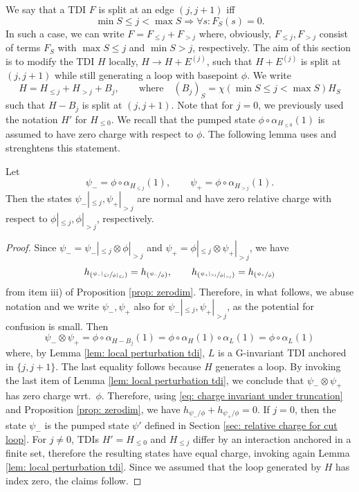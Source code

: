 We say that a TDI $F$ is split at an edge $(j,j+1)$ iff\
$$
\min S \leq j <\max S  \Rightarrow \forall s: F_S(s)=0.
$$
In such a case, we can write $F=F_{\leq j}+F_{>j}$ where, obviously, $F_{\leq j}, F_{>j}$ consist of terms $F_S$ with $\max S\leq j$ and $\min S>j$, respectively. The aim of this section is to modify the TDI $H$ locally, $H \to H+E^{(j)}$, such that $H+E^{(j)}$ is split at $(j,j+1)$  while still generating a loop with basepoint $\phi$.
We write 
$$
H=H_{\leq j}+H_{>j} + B_j,\qquad \text{where}\quad (B_j)_S= \chi( \min S \leq j <\max S)  H_S
$$ 
such that $H-B_j$ is split at $(j,j+1)$. 
Note that for $j=0$, we previously used the notation $H'$ for $H_{\leq 0}$. 
We recall that the pumped state $\phi\circ\alpha_{H_{\leq 0}}(1)$ is assumed to have zero charge with respect to $\phi$. The following lemma uses and strenghtens this statement.
\begin{lemma}\label{lem: zero charge both sides}
	Let 
	$$
	\psi_-=\phi\circ\alpha_{H_{\leq j}}(1), \qquad \psi_+=\phi\circ\alpha_{H_{> j}}(1).
	$$
	Then the states $\psi_-|_{\leq j},\psi_+|_{> j} $ are normal and have zero relative charge with respect to $\phi|_{\leq j},\phi|_{> j} $, respectively. 
\end{lemma}
\begin{proof}
	Since $\psi_-=\psi_-|_{\leq j} \otimes \phi|_{> j}$ and  $\psi_+=\phi|_{\leq j} \otimes \psi_+|_{> j}$, we have  
	\begin{equation}\label{eq: charge invariant under truncation}
		h_{\left(\sfrac{\psi_-|_{\leq j}}{\phi|_{\leq j}}\right)} =  h_{\left(\sfrac{\psi_-}{\phi}\right)},\qquad   h_{\left(\sfrac{\psi_+|_{>j}}{\phi|_{> j}}\right)}=  h_{\left(\sfrac{\psi_+}{\phi}\right)}
	\end{equation}
	from item iii) of Proposition \ref{prop: zerodim}. 
	Therefore, in what follows, we abuse notation and we write $\psi_-,\psi_+ $ also for $\psi_-|_{\leq j},\psi_+|_{> j} $, as the potential for confusion is small. 
	Then
	$$
	\psi_-\otimes\psi_+= \phi\circ \alpha_{H-B_j}(1)= \phi\circ\alpha_{H}(1)\circ   \alpha_L(1)=  \phi  \circ \alpha_L(1)
	$$
	where, by Lemma \ref{lem: local perturbation tdi}, $L$ is a G-invariant TDI anchored in $\{j,j+1\}$. The last equality follows because $H$ generates a loop. By invoking the last item of Lemma \ref{lem: local perturbation tdi}, we conclude that $\psi_- \otimes\psi_+$ has zero charge wrt.\ $\phi$. Therefore, using \eqref{eq: charge invariant under truncation} and Proposition \ref{prop: zerodim}, we have $h_{\psi_-/\phi}+h_{\psi_+/\phi}=0$.  
	If $j=0$, then the state $\psi_-$ is the pumped state $\psi'$ defined in Section \eqref{sec: relative charge for cut loop}. For $j\neq0$, TDIs $H'=H_{\leq 0}$ and $H_{\leq j}$ differ by an interaction anchored in a finite set, therefore the resulting states have equal charge, invoking again Lemma \ref{lem: local perturbation tdi}. Since we assumed that the loop generated by $H$ has index zero, the claims  follow. 
\end{proof}


